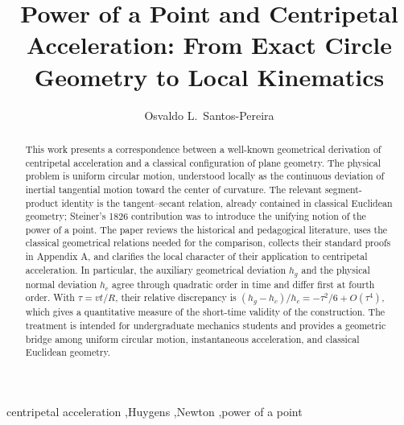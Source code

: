 \documentclass[preprint,12pt,3p,nopreprintline]{elsarticle}
\def\corref#1{}%
\def\fnref#1{}%
\numberwithin{equation}{section}
\theoremstyle{remark}
\begin{document}
\begin{frontmatter}

\title{\Large Power of a Point and Centripetal Acceleration: From Exact Circle Geometry to Local Kinematics}

\author[1]{Osvaldo L.\ Santos-Pereira\corref{cor3}\fnref{fn1}}

\address[1]{Physics Institute, Universidade Federal do Rio de Janeiro, Rio de Janeiro, Brazil}


\begin{abstract}
This work presents a correspondence between a well-known geometrical derivation of centripetal acceleration and a classical configuration of plane geometry. The physical problem is uniform circular motion, understood locally as the continuous deviation of inertial tangential motion toward the center of curvature. The relevant segment-product identity is the tangent--secant relation, already contained in classical Euclidean geometry; Steiner's 1826 contribution was to introduce the unifying notion of the power of a point. The paper reviews the historical and pedagogical literature, uses the classical geometrical relations needed for the comparison, collects their standard proofs in Appendix A, and clarifies the local character of their application to centripetal acceleration. In particular, the auxiliary geometrical deviation $h_g$ and the physical normal deviation $h_c$ agree through quadratic order in time and differ first at fourth order. With $\tau=vt/R$, their relative discrepancy is $(h_g-h_c)/h_c=-\tau^2/6+O(\tau^4)$, which gives a quantitative measure of the short-time validity of the construction. The treatment is intended for undergraduate mechanics students and provides a geometric bridge among uniform circular motion, instantaneous acceleration, and classical Euclidean geometry.
\end{abstract}

\begin{keyword}
centripetal acceleration \sep Huygens \sep Newton \sep power of a point
\end{keyword}

\end{frontmatter}

\clearpage
\thispagestyle{plain}

\end{document}
